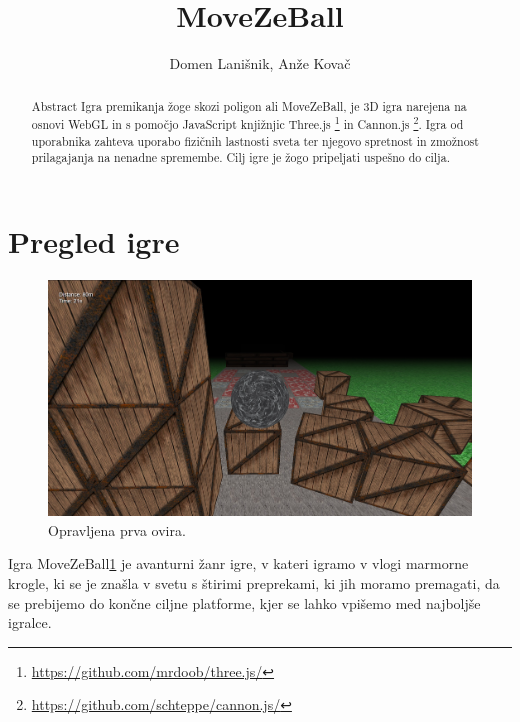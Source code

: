 \documentclass[a4paper]{article}
\begin{document}
\title{MoveZeBall}

\author{Domen Lanišnik, Anže Kovač} %



\maketitle


\begin{abstract}{Abstract}
Igra premikanja žoge skozi poligon ali MoveZeBall, je 3D igra narejena na osnovi WebGL in s pomočjo JavaScript knjižnjic Three.js \footnote{\url{https://github.com/mrdoob/three.js/}} in Cannon.js \footnote{\url{https://github.com/schteppe/cannon.js/}}. Igra od uporabnika zahteva uporabo fizičnih lastnosti sveta ter njegovo spretnost in zmožnost prilagajanja na nenadne spremembe. Cilj igre je žogo pripeljati uspešno do cilja.
\end{abstract}


\section{Pregled igre}
\begin{figure}[!htb]
    \begin{center}
        \includegraphics[width=\columnwidth]{moveZeBall.jpg}
        \caption{Opravljena prva ovira.} \label{fig:slika}
    \end{center}
\end{figure}
Igra MoveZeBall\ref{fig:slika} je avanturni žanr igre, v kateri igramo v vlogi marmorne krogle, ki se je znašla v svetu s štirimi preprekami, ki jih moramo premagati, da se prebijemo do končne ciljne platforme, kjer se lahko vpišemo med najboljše igralce. 
\end{document}
